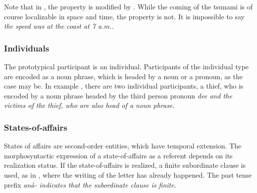 Note that in , the property is modified by . While the coming of the tsunami is of course localizable in space and time, the property  is not. It is impossible to say \em the speed was at the coast at 7 a.m.\em.



%



\subsubsection{Individuals}\label{sec:func:Individuals}
The prototypical participant is an individual. Participants of the individual type are encoded as a noun phrase, which is headed by a noun or a pronoun, as the case may be. In example , there are two individual participants, a thief, who is encoded by a noun phrase headed by the third person pronoun \em dee \em and the victims of the thief, who are also head of a noun phrase.





\subsubsection{States-of-affairs}\label{sec:func:States-of-affairs}
States of affairs are second-order entities, which have temporal extension. The morphosyntactic expression of a state-of-affairs as a referent depends on its realization status. If the state-of-affairs is realized, a finite subordinate clause is used, as in , where the writing of the letter has already happened. The past tense prefix \em anà- \em indicates that the subordinate clause is finite.

